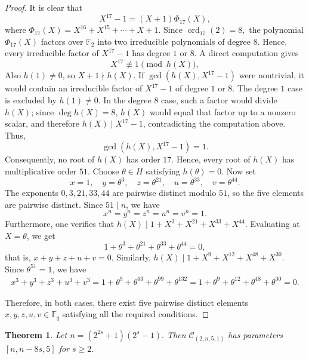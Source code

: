 \documentclass[12pt,draftcls,journal,onecolumn]{IEEEtran}
\newtheorem{theorem}{Theorem}
\begin{document}
\begin{proof}
It is clear that
\[
X^{17}-1=(X+1)\Phi_{17}(X),
\]
where
$
\Phi_{17}(X)=X^{16}+X^{15}+\cdots+X+1.
$
Since
$
\operatorname{ord}_{17}(2)=8,
$
the polynomial \(\Phi_{17}(X)\) factors over \(\mathbb F_2\) into two irreducible polynomials of degree \(8\). Hence, every irreducible factor of \(X^{17}-1\) has degree \(1\) or \(8\).
A direct computation gives
\[
X^{17}\not\equiv 1\pmod{h(X)},
\]
Also \(h(1)\neq 0\), so \(X+1\nmid h(X)\). If \(\gcd(h(X),X^{17}-1)\) were nontrivial, it would contain an irreducible factor of \(X^{17}-1\) of degree \(1\) or \(8\). The degree \(1\) case is excluded by \(h(1)\neq 0\). In the degree \(8\) case, such a factor would divide \(h(X)\); since \(\deg h(X)=8\), \(h(X)\) would equal that factor up to a nonzero scalar, and therefore \(h(X)\mid X^{17}-1\), contradicting the computation above. Thus,
\[
\gcd(h(X),X^{17}-1)=1.
\]
Consequently, no root of \(h(X)\) has order \(17\).
Hence, every root of \(h(X)\) has multiplicative order \(51\).
Choose \(\theta\in H\) satisfying \(h(\theta)=0\).
Now set
\[
x=1,\quad y=\theta^3,\quad z=\theta^{21},\quad u=\theta^{33},\quad v=\theta^{44}.
\]
The exponents \(0,3,21,33,44\) are pairwise distinct modulo \(51\), so the five elements are pairwise distinct. Since \(51\mid n\), we have
\[
x^n=y^n=z^n=u^n=v^n=1.
\]
Furthermore, one verifies that
$
h(X)\mid 1+X^3+X^{21}+X^{33}+X^{44}.
$
Evaluating at \(X=\theta\), we get
\[
1+\theta^3+\theta^{21}+\theta^{33}+\theta^{44}=0,
\]
that is,
$
x+y+z+u+v=0.
$
Similarly,
$
h(X)\mid 1+X^9+X^{12}+X^{48}+X^{30}.
$
Since \(\theta^{51}=1\), we have
\[
\begin{aligned}
x^3+y^3+z^3+u^3+v^3
=1+\theta^9+\theta^{63}+\theta^{99}+\theta^{132}=1+\theta^9+\theta^{12}+\theta^{48}+\theta^{30}=0.
\end{aligned}
\]


Therefore, in both cases, there exist five pairwise distinct elements
$x,y,z,u,v\in\mathbb{F}_{q}$ satisfying all the required conditions.
\end{proof}

\begin{theorem}\label{Theoremc1}
Let $n=(2^{2s}+1)(2^s-1).$ Then $\mathcal{C}_{(2,n,5,1)}$ has parameters $[n, n-8s, 5]$ for $s\geq2$.
\end{theorem}
\end{document}
